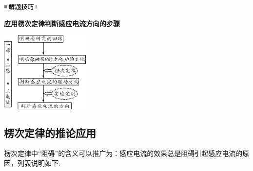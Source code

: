\begin{center}\includegraphics[width=0.70764in,height=0.12292in]{media/image37.png}\end{center}
\begin{center}
	\textbf{应用楞次定律判断感应电流方向的步骤}
\end{center}

\begin{center}\includegraphics[width=1.75486in,height=1.59444in]{media/image390.png}\end{center}

\newpage
\subsection{楞次定律的推论应用}

楞次定律中``阻碍''的含义可以推广为：感应电流的效果总是阻碍引起感应电流的原因，列表说明如下.


